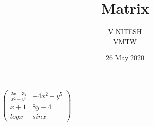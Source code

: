 \documentclass[12pt,a4paper]{article}
\title{Matrix}
\author{V NITESH \\ VMTW}
\date{26 May 2020}
\begin{document}
\maketitle

$\begin{pmatrix}

\frac{2x+3y}{x^2+y^3}& {-4x^2-y^5}\\
x+1 & 8y-4\\
logx & sinx
\end{pmatrix}$
\end{document}
